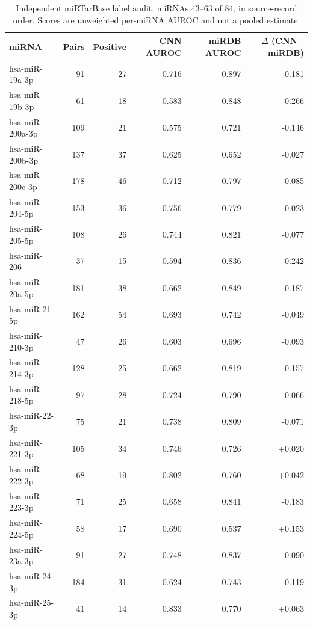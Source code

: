 \begin{table}[htbp]\centering\scriptsize
\begin{tabular}{lrrrrr}\hline
miRNA & Pairs & Positive & CNN AUROC & miRDB AUROC & $\Delta$ (CNN$-$miRDB) \\ \hline
hsa-miR-19a-3p & 91 & 27 & 0.716 & 0.897 & -0.181 \\
hsa-miR-19b-3p & 61 & 18 & 0.583 & 0.848 & -0.266 \\
hsa-miR-200a-3p & 109 & 21 & 0.575 & 0.721 & -0.146 \\
hsa-miR-200b-3p & 137 & 37 & 0.625 & 0.652 & -0.027 \\
hsa-miR-200c-3p & 178 & 46 & 0.712 & 0.797 & -0.085 \\
hsa-miR-204-5p & 153 & 36 & 0.756 & 0.779 & -0.023 \\
hsa-miR-205-5p & 108 & 26 & 0.744 & 0.821 & -0.077 \\
hsa-miR-206 & 37 & 15 & 0.594 & 0.836 & -0.242 \\
hsa-miR-20a-5p & 181 & 38 & 0.662 & 0.849 & -0.187 \\
hsa-miR-21-5p & 162 & 54 & 0.693 & 0.742 & -0.049 \\
hsa-miR-210-3p & 47 & 26 & 0.603 & 0.696 & -0.093 \\
hsa-miR-214-3p & 128 & 25 & 0.662 & 0.819 & -0.157 \\
hsa-miR-218-5p & 97 & 28 & 0.724 & 0.790 & -0.066 \\
hsa-miR-22-3p & 75 & 21 & 0.738 & 0.809 & -0.071 \\
hsa-miR-221-3p & 105 & 34 & 0.746 & 0.726 & +0.020 \\
hsa-miR-222-3p & 68 & 19 & 0.802 & 0.760 & +0.042 \\
hsa-miR-223-3p & 71 & 25 & 0.658 & 0.841 & -0.183 \\
hsa-miR-224-5p & 58 & 17 & 0.690 & 0.537 & +0.153 \\
hsa-miR-23a-3p & 91 & 27 & 0.748 & 0.837 & -0.090 \\
hsa-miR-24-3p & 184 & 31 & 0.624 & 0.743 & -0.119 \\
hsa-miR-25-3p & 41 & 14 & 0.833 & 0.770 & +0.063 \\
\hline\end{tabular}
\caption{Independent miRTarBase label audit, miRNAs 43--63 of 84, in source-record order. Scores are unweighted per-miRNA AUROC and not a pooled estimate.}\label{tab:mirna-audit-3}
\end{table}
